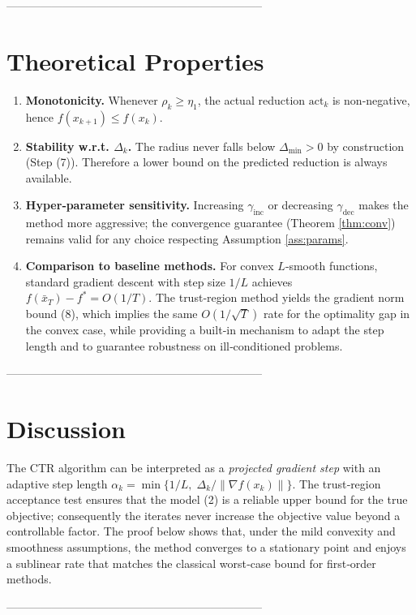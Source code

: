 \documentclass{article}
\begin{document}
--------------------------------------------------------------------

\section*{Theoretical Properties}
\begin{enumerate}[label=\arabic*)]
\item \textbf{Monotonicity.}  Whenever $\rho_{k}\ge\eta_{1}$, the actual reduction
$\text{act}_{k}$ is non‑negative, hence $f(x_{k+1})\le f(x_{k})$.
\item \textbf{Stability w.r.t. $\Delta_{k}$.}  The radius never falls below $\Delta_{\min}>0$
by construction (Step (7)).  Therefore a lower bound on the predicted
reduction is always available.
\item \textbf{Hyper‑parameter sensitivity.}
Increasing $\gamma_{\text{inc}}$ or decreasing $\gamma_{\text{dec}}$ makes the
method more aggressive; the convergence guarantee (Theorem \ref{thm:conv})
remains valid for any choice respecting Assumption \ref{ass:params}.
\item \textbf{Comparison to baseline methods.}
For convex $L$‑smooth functions, standard gradient descent with step size $1/L$
achieves $f(\bar{x}_{T})-f^{*}=O(1/T)$.  The trust‑region method yields the
gradient norm bound (8), which implies the same $O(1/\sqrt{T})$ rate for
the optimality gap in the convex case, while providing a built‑in
mechanism to adapt the step length and to guarantee robustness on ill‑conditioned problems.
\end{enumerate}

--------------------------------------------------------------------

\section*{Discussion}
The CTR algorithm can be interpreted as a \emph{projected gradient step}
with an adaptive step length $\alpha_{k}=\min\{1/L,\;\Delta_{k}/\|\nabla f(x_{k})\|\}$.
The trust‑region acceptance test ensures that the model (2) is a reliable
upper bound for the true objective; consequently the iterates never increase
the objective value beyond a controllable factor.  The proof below
shows that, under the mild convexity and smoothness assumptions,
the method converges to a stationary point and enjoys a sublinear
rate that matches the classical worst‑case bound for first‑order methods.

--------------------------------------------------------------------
\end{document}
